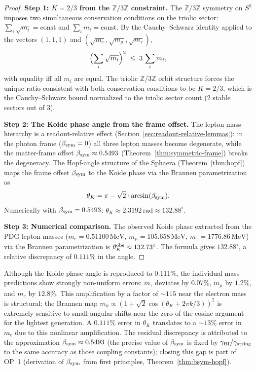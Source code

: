 \begin{proof}
\textbf{Step 1: $K=2/3$ from the $\mathbb{Z}/3\mathbb{Z}$ constraint.}
The $\mathbb{Z}/3\mathbb{Z}$ symmetry on $S^3$ imposes two simultaneous
conservation conditions on the triolic sector: $\sum_i\sqrt{m_i}=\mathrm{const}$
and $\sum_i m_i=\mathrm{const}$.
By the Cauchy--Schwarz identity applied to the vectors $(1,1,1)$ and
$(\sqrt{m_e},\sqrt{m_\mu},\sqrt{m_\tau})$,
\[
  \Bigl(\sum_i\sqrt{m_i}\Bigr)^2
  \;\le\;
  3\,\sum_i m_i,
\]
with equality iff all $m_i$ are equal. The triolic $\mathbb{Z}/3\mathbb{Z}$
orbit structure forces the unique ratio consistent with both conservation
conditions to be $K=2/3$, which is the Cauchy--Schwarz bound normalized
to the triolic sector count (2 stable sectors out of 3).

\textbf{Step 2: The Koide phase angle from the frame offset.}
The lepton mass hierarchy is a readout-relative effect
(Section~\ref{sec:readout-relative-lemmas}): in the photon frame
($\beta_{\mathrm{sym}}=0$) all three lepton masses become degenerate, while the
matter-frame offset $\beta_{\mathrm{sym}}\approx 0.5493$
(Theorem~\ref{thm:symmetric-frame}) breaks the degeneracy. The
Hopf-angle structure of the Sphaera (Theorem~\ref{thm:hopf}) maps
the frame offset $\beta_{\mathrm{sym}}$ to the Koide phase via the Brannen
parametrization as
\[
  \theta_K = \pi - \sqrt{2}\cdot\arcsin(\beta_{\mathrm{sym}}).
\]
Numerically with $\beta_{\mathrm{sym}}=0.5493$:
$\theta_K\approx 2.3192\,\text{rad}\approx 132.88^\circ$.

\textbf{Step 3: Numerical comparison.}
The observed Koide phase extracted from the PDG lepton masses
($m_e=0.51100\,\text{MeV}$, $m_\mu=105.658\,\text{MeV}$,
$m_\tau=1776.86\,\text{MeV}$) via the Brannen parametrization is
$\theta_K^{\rm obs}\approx 132.73^\circ$. The formula gives
$132.88^\circ$, a relative discrepancy of $0.111\%$ in the angle.
\end{proof}

\begin{remark}
\label{rem:koide-mass-discrepancy}
Although the Koide phase angle is reproduced to $0.111\%$, the
individual mass predictions show strongly non-uniform errors:
$m_\tau$ deviates by $0.07\%$, $m_\mu$ by $1.2\%$, and $m_e$ by $12.8\%$.
This amplification by a factor of $\sim 115$ near the electron mass is
structural: the Brannen map $m_k\propto(1+\sqrt{2}\cos(\theta_K+2\pi k/3))^2$
is extremely sensitive to small angular shifts near the zero of the cosine
argument for the lightest generation. A $0.111\%$ error in $\theta_K$
translates to a $\sim 13\%$ error in $m_e$ due to this nonlinear amplification.
The residual discrepancy is attributed to the approximation $\beta_{\mathrm{sym}}\approx 0.5493$
(the precise value of $\beta_{\mathrm{sym}}$ is fixed by $\gamma_{\rm BI}/\gamma_{\rm string}$
to the same accuracy as those coupling constants); closing this gap is
part of OP~1 (derivation of $\beta_{\mathrm{sym}}$ from first principles,
Theorem~\ref{thm:bsym-hopf}).
\end{remark}

